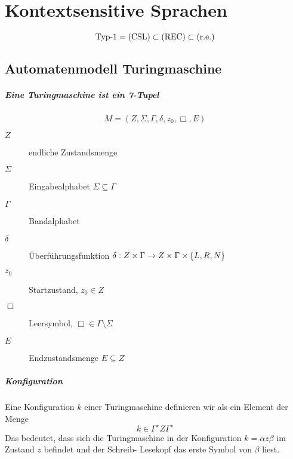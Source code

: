 \chapter{Kontextsensitive Sprachen}
\begin{equation*}
	\text{Typ-1} = \mathrm{(CSL)}\subset\mathrm{(REC)}\subset\mathrm{(r.e.)}
\end{equation*}

\section{Automatenmodell Turingmaschine}
\paragraph{Eine Turingmaschine ist ein 7-Tupel}
\begin{equation*}
	M=(Z,\Sigma,\Gamma,\delta,z_0,\Box,E)
\end{equation*}
\begin{description}
	\item[$Z$] endliche Zustandsmenge
	\item[$\Sigma$] Eingabealphabet $\Sigma\subseteq\Gamma$
	\item[$\Gamma$] Bandalphabet
	\item[$\delta$] Überführungsfunktion $\delta: Z\times\Gamma\rightarrow Z\times\Gamma\times\left\{ L,R,N \right\}$
	\item[$z_0$] Startzustand, $z_0\in Z$
	\item[$\Box$] Leersymbol, $\Box\in\Gamma\setminus\Sigma$
	\item[$E$] Endzustandsmenge $E\subseteq Z$
\end{description}

\paragraph{Konfiguration}
Eine Konfiguration $k$ einer Turingmaschine definieren wir als ein Element der Menge
\begin{equation*}
	k\in\Gamma^\star Z\Gamma^\star
\end{equation*}
Das bedeutet, dass sich die Turingmaschine in der Konfiguration $k=\alpha z\beta$ im Zustand $z$ befindet und der Schreib- Lesekopf das erste Symbol von $\beta$ liest.


